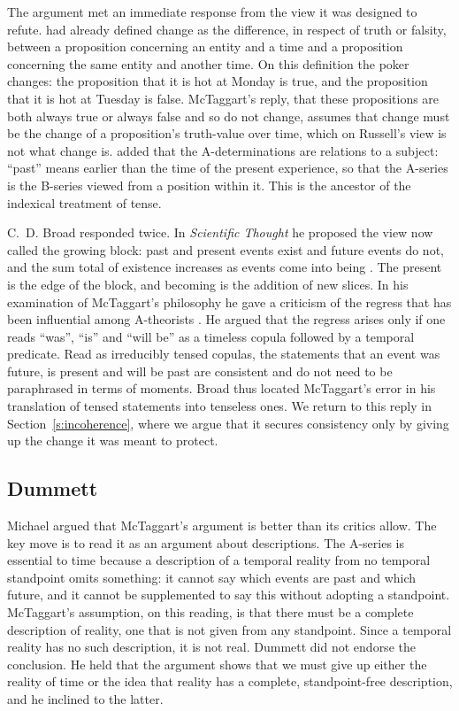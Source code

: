 \documentclass{situationist-preprint}
\begin{document}
The argument met an immediate response from the view it was designed to refute. \citet[§442]{Russell1903} had already defined change as the difference, in respect of truth or falsity, between a proposition concerning an entity and a time and a proposition concerning the same entity and another time. On this definition the poker changes: the proposition that it is hot at Monday is true, and the proposition that it is hot at Tuesday is false. McTaggart's reply, that these propositions are both always true or always false and so do not change, assumes that change must be the change of a proposition's truth-value over time, which on Russell's view is not what change is. \citet{Russell1915} added that the A-determinations are relations to a subject: \enquote{past} means earlier than the time of the present experience, so that the A-series is the B-series viewed from a position within it. This is the ancestor of the indexical treatment of tense.

C.~D. Broad responded twice. In \emph{Scientific Thought} he proposed the view now called the growing block: past and present events exist and future events do not, and the sum total of existence increases as events come into being \citep{Broad1923}. The present is the edge of the block, and becoming is the addition of new slices. In his examination of McTaggart's philosophy he gave a criticism of the regress that has been influential among A-theorists \citep{Broad1938}. He argued that the regress arises only if one reads \enquote{was}, \enquote{is} and \enquote{will be} as a timeless copula followed by a temporal predicate. Read as irreducibly tensed copulas, the statements that an event was future, is present and will be past are consistent and do not need to be paraphrased in terms of moments. Broad thus located McTaggart's error in his translation of tensed statements into tenseless ones. We return to this reply in Section~\ref{s:incoherence}, where we argue that it secures consistency only by giving up the change it was meant to protect.

\subsection{Dummett}

Michael \citet{Dummett1960} argued that McTaggart's argument is better than its critics allow. The key move is to read it as an argument about descriptions. The A-series is essential to time because a description of a temporal reality from no temporal standpoint omits something: it cannot say which events are past and which future, and it cannot be supplemented to say this without adopting a standpoint. McTaggart's assumption, on this reading, is that there must be a complete description of reality, one that is not given from any standpoint. Since a temporal reality has no such description, it is not real. Dummett did not endorse the conclusion. He held that the argument shows that we must give up either the reality of time or the idea that reality has a complete, standpoint-free description, and he inclined to the latter.
\end{document}
